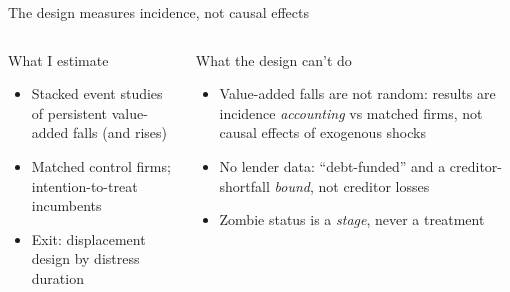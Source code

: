 \documentclass[aspectratio=169,11pt]{beamer}
\begin{document}
\begin{frame}[label=design]{The design measures incidence, not causal effects}
  \begin{columns}[T,onlytextwidth]
    \begin{cardbox}{What I estimate}
      \begin{itemize}
        \item Stacked event studies of persistent value-added falls (and rises)
        \item Matched control firms; intention-to-treat incumbents
        \item Exit: displacement design by distress duration
      \end{itemize}
    \end{cardbox}
    \begin{cardbox}[colbacktitle=SoftCoral, colframe=SoftCoral!45]{What the design can't do}
      \begin{itemize}
        \item Value-added falls are \alert{not random}: results are incidence \emph{accounting} vs matched firms, not causal effects of exogenous shocks
        \item No lender data: ``debt-funded'' and a creditor-shortfall \emph{bound}, not creditor losses
        \item Zombie status is a \emph{stage}, never a treatment
      \end{itemize}
    \end{cardbox}
  \end{columns}
\end{frame}
\end{document}
